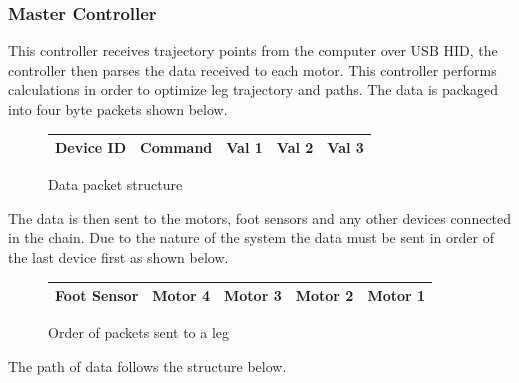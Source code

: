     \subsubsection{Master Controller}
    This controller receives trajectory points from the computer over USB HID, the controller then parses the data received to each motor. This controller performs calculations in order to optimize leg trajectory and paths. The data is packaged into four byte packets shown below.  
    \begin{figure}[H]
    \centering
    \begin{tabular}{|c|c|c|c|c|}
    \hline
     Device ID& Command & Val 1 & Val 2 & Val 3\\
    \hline
    \end{tabular}
    \caption{Data packet structure}
    \label{fig:my_label}
\end{figure}
The data is then sent to the motors, foot sensors and any other devices connected in the chain. Due to the nature of the system the data must be sent in order of the last device first as shown below. 
\begin{figure}[H]
    \centering
    \begin{tabular}{|c|c|c|c|c|}
    \hline
        Foot Sensor & Motor 4 & Motor 3 & Motor 2 & Motor 1  \\
        \hline
    \end{tabular}
    \caption{Order of packets sent to a leg}
    \label{fig:my_label}
\end{figure}
The path of data follows the structure below.


